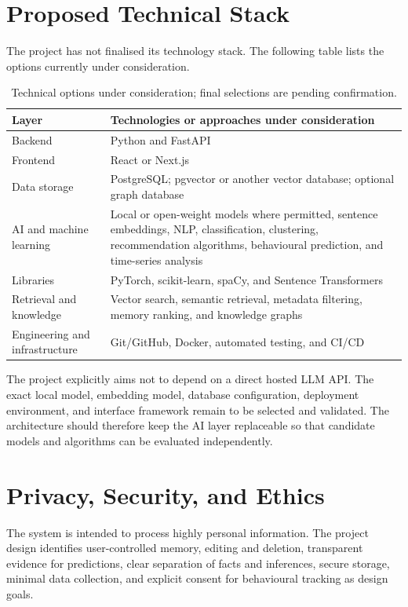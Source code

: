 \documentclass{tietreport}
\begin{document}
\clearpage
\section{Proposed Technical Stack}
The project has not finalised its technology stack. The following table lists the options currently under consideration.
\begin{table}[H]
\centering
\small
\begin{tabular}{p{35mm}p{100mm}}
\toprule
\textbf{Layer} & \textbf{Technologies or approaches under consideration} \\
\midrule
Backend & Python and FastAPI \\
Frontend & React or Next.js \\
Data storage & PostgreSQL; pgvector or another vector database; optional graph database \\
AI and machine learning & Local or open-weight models where permitted, sentence embeddings, NLP, classification, clustering, recommendation algorithms, behavioural prediction, and time-series analysis \\
Libraries & PyTorch, scikit-learn, spaCy, and Sentence Transformers \\
Retrieval and knowledge & Vector search, semantic retrieval, metadata filtering, memory ranking, and knowledge graphs \\
Engineering and infrastructure & Git/GitHub, Docker, automated testing, and CI/CD \\
\bottomrule
\end{tabular}
\caption{Technical options under consideration; final selections are pending confirmation.}
\label{tab:stack}
\end{table}

The project explicitly aims not to depend on a direct hosted LLM API. The exact local model, embedding model, database configuration, deployment environment, and interface framework remain to be selected and validated. The architecture should therefore keep the AI layer replaceable so that candidate models and algorithms can be evaluated independently.

\clearpage
\section{Privacy, Security, and Ethics}
The system is intended to process highly personal information. The project design identifies user-controlled memory, editing and deletion, transparent evidence for predictions, clear separation of facts and inferences, secure storage, minimal data collection, and explicit consent for behavioural tracking as design goals.
\end{document}
